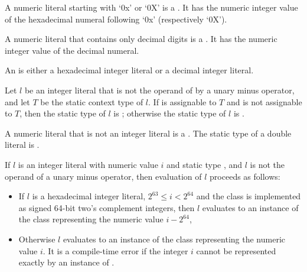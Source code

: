 \documentclass[makeidx]{article}
\begin{document}
{\LMHash{}%
A numeric literal starting with `0x' or `0X'
is a .
It has the numeric integer value of the hexadecimal numeral
following `0x' (respectively `0X').

\LMHash{}%
A numeric literal that contains only decimal digits is a
.
It has the numeric integer value of the decimal numeral.

\LMHash{}%
An 
is either a hexadecimal integer literal or a decimal integer literal.

\LMHash{}%
Let $l$ be an integer literal that is not the operand
of by a unary minus operator,
and let $T$ be the static context type of $l$.
If  is assignable to $T$ and  is not assignable to $T$,
then the static type of $l$ is ;
otherwise the static type of $l$ is .


\LMHash{}%
A numeric literal that is not an integer literal is a
.
The static type of a double literal is .

\LMHash{}%
If $l$ is an integer literal with numeric value $i$ and static type ,
and $l$ is not the operand of a unary minus operator,
then evaluation of $l$ proceeds as follows:

\begin{itemize}
  \item{} If $l$ is a hexadecimal integer literal,
  $2^{63} \le i < 2^{64}$ and the  class is implemented as
  signed 64-bit two's complement integers,
  then $l$ evaluates to an instance of the  class
  representing the numeric value $i - 2^{64}$,
  \item{} Otherwise $l$ evaluates to an instance of the  class
  representing the numeric value $i$.
  It is a compile-time error if the integer $i$ cannot be represented
  exactly by an instance of .
\end{itemize}


}
\end{document}

